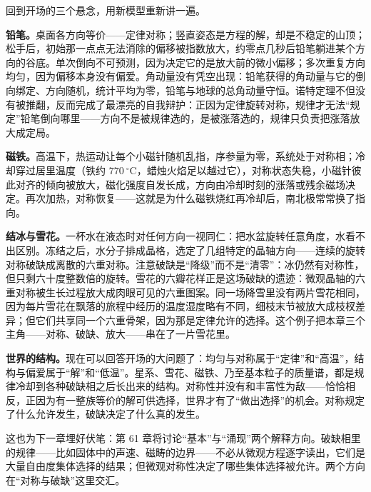 \begin{mainline}
回到开场的三个悬念，用新模型重新讲一遍。

\textbf{铅笔。}桌面各方向等价——定律对称；竖直姿态是方程的解，却是不稳定的山顶；松手后，初始那一点点无法消除的偏移被指数放大，约零点几秒后铅笔躺进某个方向的谷底。单次倒向不可预测，因为决定它的是放大前的微小偏移；多次重复方向均匀，因为偏移本身没有偏爱。角动量没有凭空出现：铅笔获得的角动量与它的倒向绑定、方向随机，统计平均为零，铅笔与地球的总角动量守恒。诺特定理不但没有被推翻，反而完成了最漂亮的自我辩护：正因为定律旋转对称，规律才无法“规定”铅笔倒向哪里——方向不是被规律选的，是被涨落选的，规律只负责把涨落放大成定局。

\textbf{磁铁。}高温下，热运动让每个小磁针随机乱指，序参量为零，系统处于对称相；冷却穿过居里温度（铁约 \(770\ ^{\circ}\mathrm{C}\)，蜡烛火焰足以越过它），对称状态失稳，小磁针彼此对齐的倾向被放大，磁化强度自发长成，方向由冷却时刻的涨落或残余磁场决定。再次加热，对称恢复——这就是为什么磁铁烧红再冷却后，南北极常常换了指向。

\textbf{结冰与雪花。}一杯水在液态时对任何方向一视同仁：把水盆旋转任意角度，水看不出区别。冻结之后，水分子排成晶格，选定了几组特定的晶轴方向——连续的旋转对称破缺成离散的六重对称。注意破缺是“降级”而不是“清零”：冰仍然有对称性，但只剩六十度整数倍的旋转。雪花的六瓣花样正是这场破缺的遗迹：微观晶轴的六重对称被生长过程放大成肉眼可见的六重图案。同一场降雪里没有两片雪花相同，因为每片雪花在飘落的旅程中经历的温度湿度略有不同，细枝末节被放大成枝杈差异；但它们共享同一个六重骨架，因为那是定律允许的选择。这个例子把本章三个主角——对称、破缺、放大——串在了一片雪花里。

\textbf{世界的结构。}现在可以回答开场的大问题了：均匀与对称属于“定律”和“高温”，结构与偏爱属于“解”和“低温”。星系、雪花、磁铁、乃至基本粒子的质量谱，都是规律冷却到各种破缺相之后长出来的结构。对称性并没有和丰富性为敌——恰恰相反，正因为有一整族等价的解可供选择，世界才有了“做出选择”的机会。对称规定了什么允许发生，破缺决定了什么真的发生。

这也为下一章埋好伏笔：第 61 章将讨论“基本”与“涌现”两个解释方向。破缺相里的规律——比如固体中的声速、磁畴的边界——不必从微观方程逐字读出，它们是大量自由度集体选择的结果；但微观对称性决定了哪些集体选择被允许。两个方向在“对称与破缺”这里交汇。
\end{mainline}


